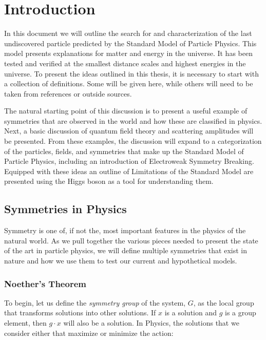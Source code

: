 \chapter{Introduction}
\label{sec:intro}

In this document we will outline the search for and characterization of the last undiscovered particle predicted by the Standard Model of Particle Physics. This model presents explanations for matter and energy in the universe. It has been tested and verified at the smallest distance scales and highest energies in the universe. To present the ideas outlined in this thesis, it is necessary to start with a collection of definitions. Some will be given here, while others will need to be taken from references or outside sources. 


The natural starting point of this discussion is to present a useful example of symmetries that are observed in the world and how these are classified in physics. Next, a basic discussion of quantum field theory and scattering amplitudes will be presented. From these examples, the discussion will expand to a categorization of the particles, fields, and symmetries that make up the Standard Model of Particle Physics, including an introduction of Electroweak Symmetry Breaking. Equipped with these ideas an outline of Limitations of the Standard Model are presented using the Higgs boson as a tool for understanding them.

\section{Symmetries in Physics}
\label{sec:Symmetries}

Symmetry is one of, if not the, most important features in the physics of the natural world. As we pull together the various pieces needed to present the state of the art in particle physics, we will define multiple symmetries that exist in nature and how we use them to test our current and hypothetical models.

\subsection{Noether's Theorem}
\label{sec:Noether}

To begin, let us define the \textit{symmetry group} of the system, $G$, as the local group that transforms solutions into other solutions. If $x$ is a solution and $g$ is a group element, then $ g \cdot x$ will also be a solution. In Physics, the solutions that we consider either that maximize or minimize the action:  

